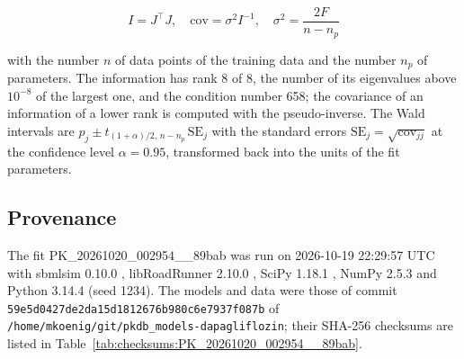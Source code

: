 \documentclass{article}
\begin{document}
\begin{equation}
I = J^\top J, \quad \mathrm{cov} = \sigma^2 I^{-1}, \quad \sigma^2 = \frac{2 F}{n - n_p}
\end{equation}

with the number $n$ of data points of the training data and the number $n_p$ of parameters. The information has rank 8 of 8, the number of its eigenvalues above $10^{-8}$ of the largest one, and the condition number 658; the covariance of an information of a lower rank is computed with the pseudo-inverse. The Wald intervals are $\hat{p}_j \pm t_{(1+\alpha)/2,\, n-n_p}\, \mathrm{SE}_j$ with the standard errors $\mathrm{SE}_j = \sqrt{\mathrm{cov}_{jj}}$ at the confidence level $\alpha = 0.95$, transformed back into the units of the fit parameters.

\subsection{Provenance}

The fit PK\_20261020\_002954\_\_89bab was run on 2026-10-19 22:29:57 UTC with sbmlsim 0.10.0 \cite{Koenig2026_sbmlsim}, libRoadRunner 2.10.0 \cite{Welsh2023}, SciPy 1.18.1 \cite{Virtanen2020}, NumPy 2.5.3 \cite{Harris2020} and Python 3.14.4 (seed 1234). The models and data were those of commit \texttt{59e5d0427de2da15d1812676b980c6e7937f087b} of \texttt{/home/mkoenig/git/pkdb\_models-dapagliflozin}; their SHA-256 checksums are listed in Table~\ref{tab:checksums:PK_20261020_002954__89bab}.
\end{document}
